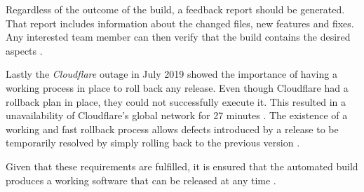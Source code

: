 Regardless of the outcome of the build, a feedback report should be generated.
That report includes information about the changed files, new features and
fixes. Any interested team member can then verify that the build contains the
desired aspects \autocite[pp. 196-198]{MatyasContinuousIntegration2007}.

Lastly the \textit{Cloudflare} outage in July 2019 showed the importance of
having a working process in place to roll back any release. Even though
Cloudflare had a rollback plan in place, they could not successfully execute
it. This resulted in a unavailability of Cloudflare's global network for 27
minutes \autocite{Graham-CummingDetailsCloudflareoutage2019}. The existence of
a working and fast rollback process allows defects introduced by a release to
be temporarily resolved by simply rolling back to the previous version
\autocite[p. 199]{MatyasContinuousIntegration2007}.

Given that these requirements are fulfilled, it is ensured that the automated
build produces a working software that can be released at any time \autocite[p.
200]{MatyasContinuousIntegration2007}.

